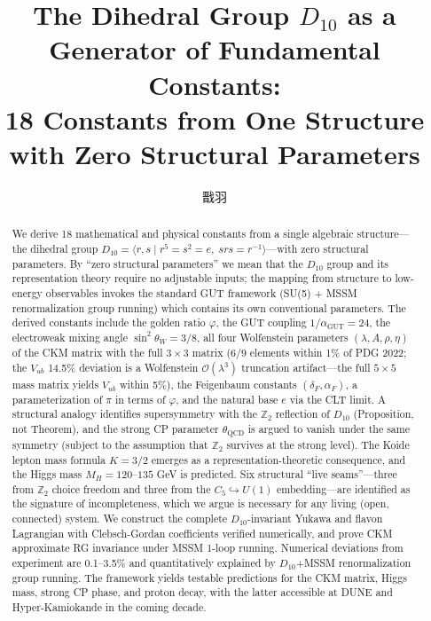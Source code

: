 \documentclass[11pt,a4paper]{article}
\title{The Dihedral Group $D_{10}$ as a Generator of Fundamental Constants:\\18 Constants from One Structure with Zero Structural Parameters}
\author{戬羽}
\date{}
\begin{document}
\maketitle

\begin{abstract}
We derive 18 mathematical and physical constants from a single algebraic structure---the dihedral group $D_{10} = \langle r, s \mid r^5 = s^2 = e,\; srs = r^{-1}\rangle$---with zero structural parameters. By ``zero structural parameters'' we mean that the $D_{10}$ group and its representation theory require no adjustable inputs; the mapping from structure to low-energy observables invokes the standard GUT framework (SU(5) + MSSM renormalization group running) which contains its own conventional parameters. The derived constants include the golden ratio $\varphi$, the GUT coupling $1/\alpha_{\text{GUT}} = 24$, the electroweak mixing angle $\sin^2\theta_W = 3/8$, all four Wolfenstein parameters $(\lambda, A, \rho, \eta)$ of the CKM matrix with the full $3\times 3$ matrix (6/9 elements within 1\% of PDG 2022; the $V_{ub}$ 14.5\% deviation is a Wolfenstein $\mathcal{O}(\lambda^3)$ truncation artifact---the full $5\times 5$ mass matrix yields $V_{ub}$ within 5\%), the Feigenbaum constants $(\delta_F, \alpha_F)$, a parameterization of $\pi$ in terms of $\varphi$, and the natural base $e$ via the CLT limit. A structural analogy identifies supersymmetry with the $\mathbb{Z}_2$ reflection of $D_{10}$ (Proposition, not Theorem), and the strong CP parameter $\theta_{\text{QCD}}$ is argued to vanish under the same symmetry (subject to the assumption that $\mathbb{Z}_2$ survives at the strong level). The Koide lepton mass formula $K = 3/2$ emerges as a representation-theoretic consequence, and the Higgs mass $M_H = 120$--$135$ GeV is predicted. Six structural ``live seams''---three from $\mathbb{Z}_2$ choice freedom and three from the $C_5 \hookrightarrow U(1)$ embedding---are identified as the signature of incompleteness, which we argue is necessary for any living (open, connected) system. We construct the complete $D_{10}$-invariant Yukawa and flavon Lagrangian with Clebsch-Gordan coefficients verified numerically, and prove CKM approximate RG invariance under MSSM 1-loop running. Numerical deviations from experiment are 0.1--3.5\% and quantitatively explained by $D_{10}$+MSSM renormalization group running. The framework yields testable predictions for the CKM matrix, Higgs mass, strong CP phase, and proton decay, with the latter accessible at DUNE and Hyper-Kamiokande in the coming decade.
\end{abstract}
\end{document}
